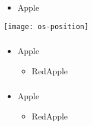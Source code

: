 %
\begin{frame}[plain]	
	\frametitle{}

	
\end{frame}
\begin{frame}[plain]	
	\frametitle{}
	
\begin{itemize}\Large
	\item Apple

\end{itemize}

\centering
\texttt{[image: os-position]}
		
\end{frame}

\begin{frame}[plain]	
	\frametitle{}
	
	\begin{itemize}\Large
		\item Apple
		\begin{itemize}\large
			\item RedApple
			
		\end{itemize}
	\end{itemize}
	
	
\end{frame}
\begin{frame}[plain]	
	\frametitle{}

\begin{itemize}
	\item Apple
	\begin{itemize}
		\item RedApple
		
	\end{itemize}
\end{itemize}
	
	
\end{frame}

